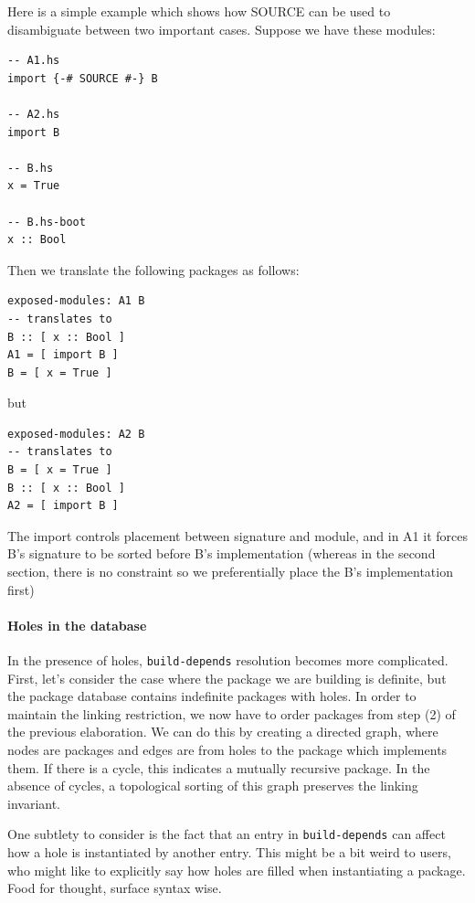 \documentclass{article}
\begin{document}
Here is a simple example which shows how SOURCE can be used to disambiguate
between two important cases. Suppose we have these modules:

\begin{verbatim}
-- A1.hs
import {-# SOURCE #-} B

-- A2.hs
import B

-- B.hs
x = True

-- B.hs-boot
x :: Bool
\end{verbatim}

Then we translate the following packages as follows:

\begin{verbatim}
exposed-modules: A1 B
-- translates to
B :: [ x :: Bool ]
A1 = [ import B ]
B = [ x = True ]
\end{verbatim}

but

\begin{verbatim}
exposed-modules: A2 B
-- translates to
B = [ x = True ]
B :: [ x :: Bool ]
A2 = [ import B ]
\end{verbatim}

The import controls placement between signature and module, and in A1 it
forces B's signature to be sorted before B's implementation (whereas in
the second section, there is no constraint so we preferentially place
the B's implementation first)

\paragraph{Holes in the database} In the presence of holes,
\verb|build-depends| resolution becomes more complicated.  First,
let's consider the case where the package we are building is
definite, but the package database contains indefinite packages with holes.
In order to maintain the linking restriction, we now have to order packages
from step (2) of the previous elaboration.  We can do this by creating
a directed graph, where nodes are packages and edges are from holes to the
package which implements them.  If there is a cycle, this indicates a mutually
recursive package.  In the absence of cycles, a topological sorting of this
graph preserves the linking invariant.

One subtlety to consider is the fact that an entry in \verb|build-depends|
can affect how a hole is instantiated by another entry.  This might be a
bit weird to users, who might like to explicitly say how holes are
filled when instantiating a package.  Food for thought, surface syntax wise.
\end{document}

